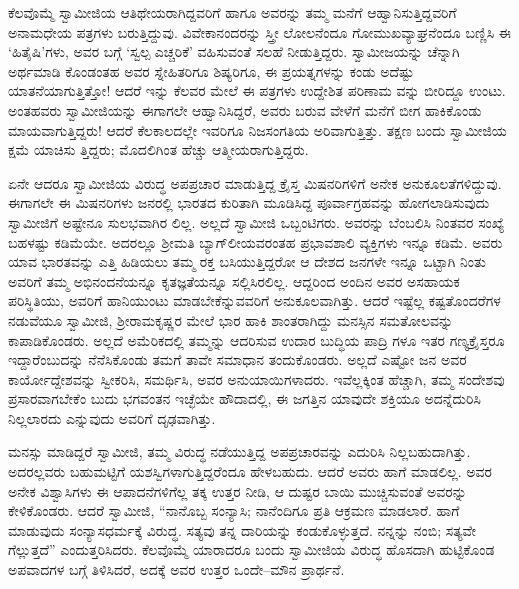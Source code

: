 ಕೆಲವೊಮ್ಮೆ ಸ್ವಾಮೀಜಿಯ ಆತಿಥೇಯರಾಗಿದ್ದವರಿಗೆ ಹಾಗೂ ಅವರನ್ನು ತಮ್ಮ ಮನೆಗೆ ಆಹ್ವಾನಿಸುತ್ತಿದ್ದವರಿಗೆ ಅನಾಮಧೇಯ ಪತ್ರಗಳು ಬರುತ್ತಿದ್ದುವು. ವಿವೇಕಾನಂದರನ್ನು ಸ್ತ್ರೀ ಲೋಲನೆಂದೂ ಗೋಮುಖವ್ಯಾಘ್ರನೆಂದೂ ಬಣ್ಣಿಸಿ ಈ ‘ಹಿತೈಷಿ’ಗಳು, ಅವರ ಬಗ್ಗೆ ‘ಸ್ವಲ್ಪ ಎಚ್ಚರಿಕೆ’ ವಹಿಸುವಂತೆ ಸಲಹೆ ನೀಡುತ್ತಿದ್ದರು. ಸ್ವಾಮೀಜಯನ್ನು ಚೆನ್ನಾಗಿ ಅರ್ಥಮಾಡಿ ಕೊಂಡಂತಹ ಅವರ ಸ್ನೇಹಿತರಿಗೂ ಶಿಷ್ಯರಿಗೂ, ಈ ಪ್ರಯತ್ನಗಳನ್ನು ಕಂಡು ಅದೆಷ್ಟು ಯಾತನೆಯಾಗುತ್ತಿತ್ತೋ! ಆದರೆ ಇನ್ನು ಕೆಲವರ ಮೇಲೆ ಈ ಪತ್ರಗಳು ಉದ್ದೇಶಿತ ಪರಿಣಾಮ ವನ್ನು ಬೀರಿದ್ದೂ ಉಂಟು. ಅಂತಹವರು ಸ್ವಾಮೀಜಿಯನ್ನು ಈಗಾಗಲೇ ಆಹ್ವಾನಿಸಿದ್ದರೆ, ಅವರು ಬರುವ ವೇಳೆಗೆ ಮನೆಗೆ ಬೀಗ ಹಾಕಿಕೊಂಡು ಮಾಯವಾಗುತ್ತಿದ್ದರು! ಆದರೆ ಕೆಲಕಾಲದಲ್ಲೇ ಇವರಿಗೂ ನಿಜಸಂಗತಿಯ ಅರಿವಾಗುತ್ತಿತ್ತು. ತಕ್ಷಣ ಬಂದು ಸ್ವಾಮೀಜಿಯ ಕ್ಷಮೆ ಯಾಚಿಸು ತ್ತಿದ್ದರು; ಮೊದಲಿಗಿಂತ ಹೆಚ್ಚು ಆತ್ಮೀಯರಾಗುತ್ತಿದ್ದರು.

ಏನೇ ಆದರೂ ಸ್ವಾಮೀಜಿಯ ವಿರುದ್ಧ ಅಪಪ್ರಚಾರ ಮಾಡುತ್ತಿದ್ದ ಕ್ರೈಸ್ತ ಮಿಷನರಿಗಳಿಗೆ ಅನೇಕ ಅನುಕೂಲತೆಗಳಿದ್ದುವು. ಈಗಾಗಲೇ ಈ ಮಿಷನರಿಗಳು ಜನರಲ್ಲಿ ಭಾರತದ ಕುರಿತಾಗಿ ಮೂಡಿಸಿದ್ದ ಪೂರ್ವಾಗ್ರಹವನ್ನು ಹೋಗಲಾಡಿಸುವುದು ಸ್ವಾಮೀಜಿಗೆ ಅಷ್ಟೇನೂ ಸುಲಭವಾಗಿರ ಲಿಲ್ಲ. ಅಲ್ಲದೆ ಸ್ವಾಮೀಜಿ ಒಬ್ಬಂಟಿಗರು. ಅವರನ್ನು ಬೆಂಬಲಿಸಿ ನಿಂತವರ ಸಂಖ್ಯೆ ಬಹಳಷ್ಟು ಕಡಿಮೆಯೇ. ಅದರಲ್ಲೂ ಶ್ರೀಮತಿ ಬ್ಯಾಗ್​ಲೀಯವರಂತಹ ಪ್ರಭಾವಶಾಲಿ ವ್ಯಕ್ತಿಗಳು ಇನ್ನೂ ಕಡಿಮೆ. ಅವರು ಯಾವ ಭಾರತವನ್ನು ಎತ್ತಿ ಹಿಡಿಯಲು ತಮ್ಮ ರಕ್ತ ಬಸಿಯುತ್ತಿದ್ದರೋ ಆ ದೇಶದ ಜನಗಳೇ ಇನ್ನೂ ಒಟ್ಟಾಗಿ ನಿಂತು ಅವರಿಗೆ ತಮ್ಮ ಅಭಿನಂದನೆಯನ್ನೂ ಕೃತಜ್ಞತೆಯನ್ನೂ ಸಲ್ಲಿಸಿರಲಿಲ್ಲ. ಆದ್ದರಿಂದ ಅಂದಿನ ಅವರ ಅಸಹಾಯಕ ಪರಿಸ್ಥಿತಿಯು, ಅವರಿಗೆ ಹಾನಿಯುಂಟು ಮಾಡಬೇಕೆನ್ನುವವರಿಗೆ ಅನುಕೂಲವಾಗಿತ್ತು. ಆದರೆ ಇಷ್ಟೆಲ್ಲ ಕಷ್ಟತೊಂದರೆಗಳ ನಡುವೆಯೂ ಸ್ವಾಮೀಜಿ, ಶ್ರೀರಾಮಕೃಷ್ಣರ ಮೇಲೆ ಭಾರ ಹಾಕಿ ಶಾಂತರಾಗಿದ್ದು ಮನಸ್ಸಿನ ಸಮತೋಲವನ್ನು ಕಾಪಾಡಿಕೊಂಡರು. ಅಲ್ಲದೆ ಅಮೆರಿಕದಲ್ಲಿ ತಮ್ಮನ್ನು ಆದರಿಸುವ ಉದಾರ ಬುದ್ಧಿಯ ಪಾದ್ರಿ ಗಳೂ ಇತರ ಗಣ್ಯಕ್ರೈಸ್ತರೂ ಇದ್ದಾರೆಂಬುದನ್ನು ನೆನೆಸಿಕೊಂಡು ತಮಗೆ ತಾವೇ ಸಮಾಧಾನ ತಂದುಕೊಂಡರು. ಅಲ್ಲದೆ ಎಷ್ಟೋ ಜನ ಅವರ ಕಾರ್ಯೋದ್ದೇಶವನ್ನು ಸ್ವೀಕರಿಸಿ, ಸಮರ್ಥಿಸಿ, ಅವರ ಅನುಯಾಯಿಗಳಾದರು. ಇವೆಲ್ಲಕ್ಕಿಂತ ಹೆಚ್ಚಾಗಿ, ತಮ್ಮ ಸಂದೇಶವು ಪ್ರಸಾರವಾಗಬೇಕೆಂ ಬುದು ಭಗವಂತನ ಇಚ್ಛೆಯೇ ಹೌದಾದಲ್ಲಿ, ಈ ಜಗತ್ತಿನ ಯಾವುದೇ ಶಕ್ತಿಯೂ ಅದನ್ನೆದುರಿಸಿ ನಿಲ್ಲಲಾರದು ಎನ್ನುವುದು ಅವರಿಗೆ ದೃಢವಾಗಿತ್ತು.

ಮನಸ್ಸು ಮಾಡಿದ್ದರೆ ಸ್ವಾಮೀಜಿ, ತಮ್ಮ ವಿರುದ್ಧ ನಡೆಯುತ್ತಿದ್ದ ಅಪಪ್ರಚಾರವನ್ನು ಎದುರಿಸಿ ನಿಲ್ಲಬಹುದಾಗಿತ್ತು. ಅದರಲ್ಲವರು ಬಹುಮಟ್ಟಿಗೆ ಯಶಸ್ವಿಗಳಾಗುತ್ತಿದ್ದರೆಂದೂ ಹೇಳಬಹುದು. ಆದರೆ ಅವರು ಹಾಗೆ ಮಾಡಲಿಲ್ಲ. ಅವರ ಅನೇಕ ವಿಶ್ವಾಸಿಗಳು ಈ ಆಪಾದನೆಗಳಿಗೆಲ್ಲ ತಕ್ಕ ಉತ್ತರ ನೀಡಿ, ಆ ದುಷ್ಟರ ಬಾಯಿ ಮುಚ್ಚಿಸುವಂತೆ ಅವರನ್ನು ಕೇಳಿಕೊಂಡರು. ಆದರೆ ಸ್ವಾಮೀಜಿ, “ನಾನೊಬ್ಬ ಸಂನ್ಯಾಸಿ; ನಾನೆಂದಿಗೂ ಪ್ರತಿ ಆಕ್ರಮಣ ಮಾಡಲಾರೆ. ಹಾಗೆ ಮಾಡುವುದು ಸಂನ್ಯಾಸಧರ್ಮಕ್ಕೆ ವಿರುದ್ಧ. ಸತ್ಯವು ತನ್ನ ದಾರಿಯನ್ನು ಕಂಡುಕೊಳ್ಳುತ್ತದೆ. ನನ್ನನ್ನು ನಂಬಿ; ಸತ್ಯವೇ ಗೆಲ್ಲುತ್ತದೆ” ಎಂದುತ್ತರಿಸಿದರು. ಕೆಲವೊಮ್ಮೆ ಯಾರಾದರೂ ಬಂದು ಸ್ವಾಮೀಜಿಯ ವಿರುದ್ಧ ಹೊಸದಾಗಿ ಹುಟ್ಟಿಕೊಂಡ ಅಪವಾದಗಳ ಬಗ್ಗೆ ತಿಳಿಸಿದರೆ, ಅದಕ್ಕೆ ಅವರ ಉತ್ತರ ಒಂದೇ–ಮೌನ ಪ್ರಾರ್ಥನೆ.

